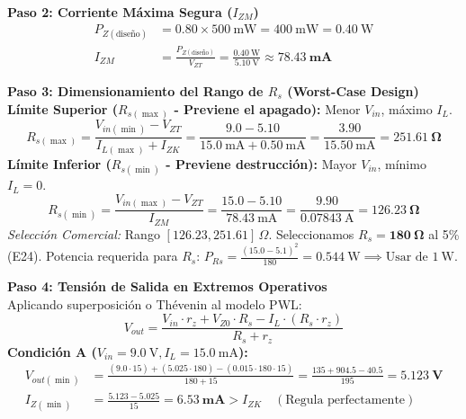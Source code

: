 \documentclass[11pt, a4paper]{article}
\begin{document}
\noindent\textbf{Paso 2: Corriente Máxima Segura ($I_{ZM}$)}\\
\begin{align}
    P_{Z(\text{diseño})} &= 0.80 \times \qty{500}{\milli\watt} = \qty{400}{\milli\watt} = \qty{0.40}{\watt} \\
    I_{ZM} &= \frac{P_{Z(\text{diseño})}}{V_{ZT}} = \frac{\qty{0.40}{\watt}}{\qty{5.10}{\volt}} \approx \mathbf{\qty{78.43}{\milli\ampere}}
\end{align}

\noindent\textbf{Paso 3: Dimensionamiento del Rango de $R_s$ (Worst-Case Design)}\\
\textbf{Límite Superior ($R_{s(\max)}$ - Previene el apagado):} Menor $V_{in}$, máximo $I_L$.
\begin{equation}
    R_{s(\max)} = \frac{V_{in(\min)} - V_{ZT}}{I_{L(\max)} + I_{ZK}} = \frac{9.0 - 5.10}{\qty{15.0}{\milli\ampere} + \qty{0.50}{\milli\ampere}} = \frac{3.90}{\qty{15.50}{\milli\ampere}} = \mathbf{\qty{251.61}{\ohm}}
\end{equation}
\textbf{Límite Inferior ($R_{s(\min)}$ - Previene destrucción):} Mayor $V_{in}$, mínimo $I_L = 0$.
\begin{equation}
    R_{s(\min)} = \frac{V_{in(\max)} - V_{ZT}}{I_{ZM}} = \frac{15.0 - 5.10}{\qty{78.43}{\milli\ampere}} = \frac{9.90}{\qty{0.07843}{\ampere}} = \mathbf{\qty{126.23}{\ohm}}
\end{equation}
\textit{Selección Comercial:} Rango $[126.23, 251.61]\,\Omega$. Seleccionamos $R_s = \mathbf{\qty{180}{\ohm}}$ al 5\% (E24). Potencia requerida para $R_s$: $P_{Rs} = \frac{(15.0 - 5.1)^2}{180} = \qty{0.544}{\watt} \implies \text{Usar de } \qty{1}{\watt}$.

\noindent\textbf{Paso 4: Tensión de Salida en Extremos Operativos}\\
Aplicando superposición o Thévenin al modelo PWL:
\begin{equation}
    V_{out} = \frac{V_{in} \cdot r_z + V_{Z0} \cdot R_s - I_L \cdot (R_s \cdot r_z)}{R_s + r_z}
\end{equation}
\textbf{Condición A ($V_{in} = \qty{9.0}{\volt}, I_L = \qty{15.0}{\milli\ampere}$):}
\begin{align}
    V_{out(\min)} &= \frac{(9.0 \cdot 15) + (5.025 \cdot 180) - (0.015 \cdot 180 \cdot 15)}{180 + 15} = \frac{135 + 904.5 - 40.5}{195} = \mathbf{\qty{5.123}{\volt}} \\
    I_{Z(\min)} &= \frac{5.123 - 5.025}{15} = \mathbf{\qty{6.53}{\milli\ampere}} > I_{ZK} \quad (\text{Regula perfectamente})
\end{align}
\end{document}
